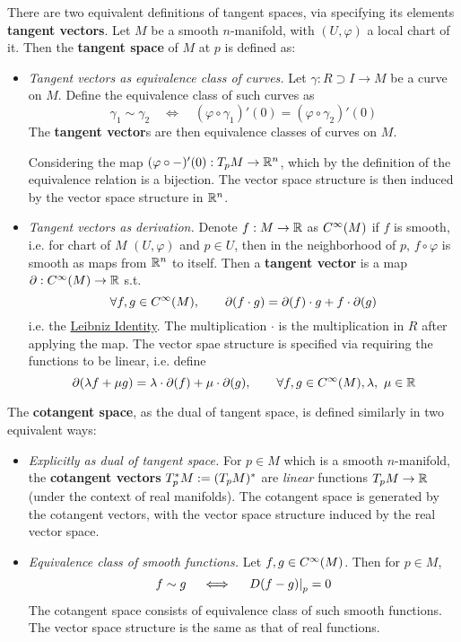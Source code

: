 \documentclass{article}
\begin{document}
\begin{definition}
    There are two equivalent definitions of tangent spaces, via specifying its elements \textbf{tangent vectors}. Let $M$ be a smooth $n$-manifold, with $(U, \varphi)$ a local chart of it. Then the \textbf{tangent space} of $M$ at $p$ is defined as:
    \begin{itemize}
        \item \emph{Tangent vectors as equivalence class of curves.} Let $\gamma: R \supset I \to M$ be a curve on $M$. Define the equivalence class of such curves as
        \[
            \gamma_1 \sim \gamma_2 \quad \iff \quad (\varphi \circ \gamma_1)'(0) = (\varphi \circ \gamma_2)'(0)
        \]
        The \textbf{tangent vector}s are then equivalence classes of curves on $M$. 
        
        Considering the map $(\varphi \circ -)'(0) : T_p M \to \mathbb{R}^n$, which by the definition of the equivalence relation is a bijection. The vector space structure is then induced by the vector space structure in $\mathbb{R}^n$.
        \item \emph{Tangent vectors as derivation.} Denote $f: M \to \mathbb{R}$ as $C^{\infty}(M)$ if $f$ is smooth, i.e. for chart of $M$ $(U, \varphi)$ and $p \in U$, then in the neighborhood of $p$, $f \circ \varphi$ is smooth as maps from $\mathbb{R}^n$ to itself. Then a \textbf{tangent vector} is a map $\partial: C^{\infty}(M) \to \mathbb{R}$ s.t.
        \[
            \forall f, g \in C^{\infty}(M), \qquad \partial (f \cdot g) = \partial(f) \cdot g + f \cdot \partial(g)
        \]
        i.e. the \underline{Leibniz Identity}. The multiplication $\cdot$ is the multiplication in $R$ after applying the map. The vector spae structure is specified via requiring the functions to be linear, i.e. define
        \[
            \partial(\lambda f + \mu g) = \lambda \cdot \partial(f) + \mu \cdot \partial(g), \qquad \forall f, g \in C^{\infty}(M), \lambda,\ \mu \in \mathbb{R}
        \]
    \end{itemize}
\end{definition}

\begin{definition}
    The \textbf{cotangent space}, as the dual of tangent space, is defined similarly in two equivalent ways:
    \begin{itemize}
        \item \emph{Explicitly as dual of tangent space.} For $p \in M$ which is a smooth $n$-manifold, the \textbf{cotangent vectors} $T_p^{\ast} M := (T_p M)^{\ast}$ are \emph{linear} functions $T_p M \to \mathbb{R}$ (under the context of real manifolds). The cotangent space is generated by the cotangent vectors, with the vector space structure induced by the real vector space.
        \item \emph{Equivalence class of smooth functions.} Let $f, g \in C^{\infty}(M)$. Then for $p \in M$, 
        \[
            f \sim g \quad \iff \quad \left.D(f - g)\right|_{p} = 0
        \]
        The cotangent space consists of equivalence class of such smooth functions. The vector space structure is the same as that of real functions.
    \end{itemize}
\end{definition}
\end{document}
